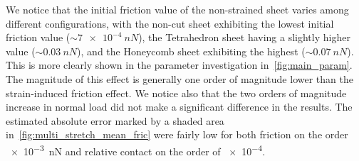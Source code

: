 We notice that the initial friction value of the non-strained sheet varies among different configurations, with the non-cut sheet exhibiting the lowest initial friction value ($\sim \SI{7e-4}{nN}$), the Tetrahedron sheet having a slightly higher value ($\sim \SI{0.03}{nN}$), and the Honeycomb sheet exhibiting the highest ($\sim \SI{0.07}{nN}$). This is more clearly shown in the parameter investigation in~\cref{fig:main_param}. The magnitude of this effect is generally one order of magnitude lower than the strain-induced friction effect. We notice also that the two orders of magnitude increase in normal load did not
make a significant difference in the results. The estimated absolute error
marked by a shaded area in~\cref{fig:multi_stretch_mean_fric} were fairly low
for both friction on the order \SI{e-3}{nN} and relative contact on the order of
\num{e-4}.


